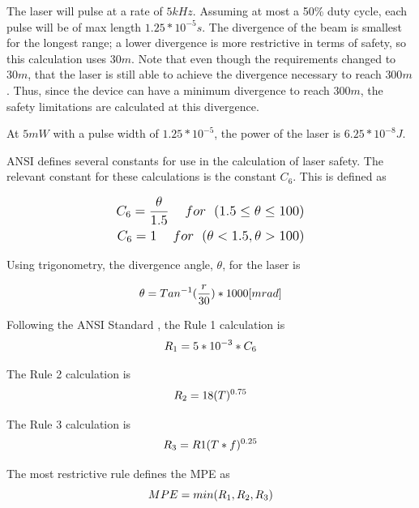 \documentclass[letterpaper,10pt]{article}
\begin{document}
\begin{spacing}{1.15}
 The laser will pulse at a rate of $5 kHz$. Assuming at most a 50\% duty cycle, each pulse will be of max length $1.25*10^{-5} s$. The divergence of the beam is smallest for the longest range; a lower divergence is more restrictive in terms of safety, so this calculation uses $30m$. Note that even though the requirements changed to $30m$, that the laser is still able to achieve the divergence necessary to reach $300m$. Thus, since the device can have a minimum divergence to reach $300m$, the safety limitations are calculated at this divergence. 
 
 At $5mW$ with a pulse width of $1.25*10^{-5}$, the power of the laser is $6.25*10^{-8} J$. 
 
 ANSI defines several constants for use in the calculation of laser safety. The relevant constant for these calculations is the constant $C_6$. This is defined as 

 \begin{align} \label{eq:1} \large \begin{split}
 	C_6 =\frac{\theta}{1.5} \hspace{5mm} for \hspace{2.5mm}(1.5 \leq \theta \leq 100)
	\\
   	C_6 = 1 \hspace{5mm} for \hspace{2.5mm} ( \theta < 1.5, \theta > 100)
   	\end{split}
 \end{align}
  
 Using trigonometry, the divergence angle, $\theta$, for the laser is 

 \begin{equation}\label{eq:2} \large
 	\theta = Tan^{-1}(\frac{r}{30})* 1000 [mrad]
 \end{equation}
 
 Following the ANSI Standard \cite{ANSI}, the Rule 1 calculation is 
 \begin{equation}
 	\large
 	R_1 = 5*10^{-3} * C_6
 \end{equation}
 
 The Rule 2 calculation is
 \begin{equation}
 	\large
 	R_2 = 18 (T)^{0.75}
 \end{equation}
 
 The Rule 3 calculation is
 \begin{equation}
 	\large
 	R_3 = R1(T*f)^{0.25}
 \end{equation}
 
 The most restrictive rule defines the MPE as
 \begin{equation}
 	\large
 	MPE = min(R_1, R_2, R_3)
 \end{equation}
 

\end{spacing}
\end{document}
